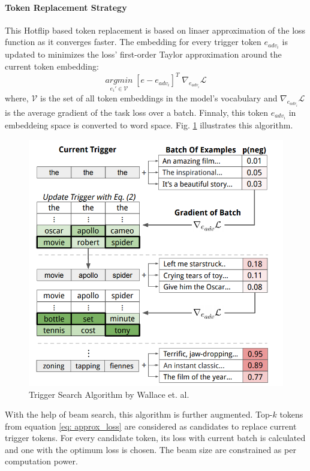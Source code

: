 \documentclass[12pt]{report}
\begin{document}
\begin{spacing}{1.5}
\paragraph{Token Replacement Strategy}
This Hotflip based token replacement is based on linaer approximation of the loss function as it converges faster.
The embedding for every trigger token $e_{adv_i}$ is updated to minimizes the loss’ first-order Taylor approximation around the current token embedding:
\begin{equation}
  \label{eq: approx_loss}
  \underset{e_{i}' \in \mathcal{V}}{argmin} \; [e -  e_{adv_i}]^T \; \nabla_{e_{adv_i}} \mathcal{L}
\end{equation}
where, $\mathcal{V}$ is the set of all token embeddings in the model’s vocabulary and $\nabla_{e_{adv_i}} \mathcal{L}$ is the average gradient of the task loss over a batch.
Finnaly, this token $e_{adv_i}$ in embeddeing space is converted to word space. Fig. \ref{trigger_algo} illustrates this algorithm.

\begin{figure}[!h]
  \centering
  \includegraphics[width=0.8\linewidth]{./img/trigger_algo.png}
  \caption{Trigger Search Algorithm by Wallace et. al. \cite{wallace2019}}
  \label{trigger_algo}
\end{figure}

With the help of beam search, this algorithm is further augmented. Top-$k$ tokens from equation \ref{eq: approx_loss} are considered as candidates to replace current trigger tokens. For every candidate token, its loss with current batch is calculated and one with the optimum loss is chosen. The beam size are constrained as per computation power.


\end{spacing}
\end{document}
